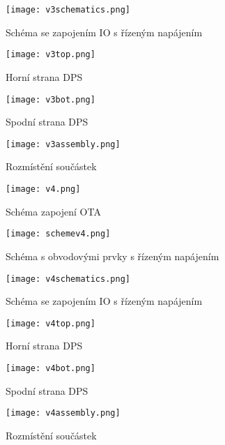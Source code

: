 \begin{figure}[h]
\centering
\texttt{[image: v3schematics.png]}
\caption{Schéma se zapojením IO s řízeným napájením}
\end{figure}
\begin{figure}[h]
\centering
\texttt{[image: v3top.png]}
\caption{Horní strana DPS}
\end{figure}
\begin{figure}[h]
\centering
\texttt{[image: v3bot.png]}
\caption{Spodní strana DPS}
\end{figure}
\begin{figure}[h]
\centering
\texttt{[image: v3assembly.png]}
\caption{Rozmístění součástek}
\end{figure}
\begin{figure}[h]
\centering
\texttt{[image: v4.png]}
\caption{Schéma zapojení OTA}
\end{figure}
\begin{figure}[h]
\centering
\texttt{[image: schemev4.png]}
\caption{Schéma s obvodovými prvky s řízeným napájením}
\end{figure}
\begin{figure}[h]
\centering
\texttt{[image: v4schematics.png]}
\caption{Schéma se zapojením IO s řízeným napájením}
\end{figure}
\begin{figure}[h]
\centering
\texttt{[image: v4top.png]}
\caption{Horní strana DPS}
\end{figure}
\begin{figure}[h]
\centering
\texttt{[image: v4bot.png]}
\caption{Spodní strana DPS}
\end{figure}
\begin{figure}[h]
\centering
\texttt{[image: v4assembly.png]}
\caption{Rozmístění součástek}
\end{figure}